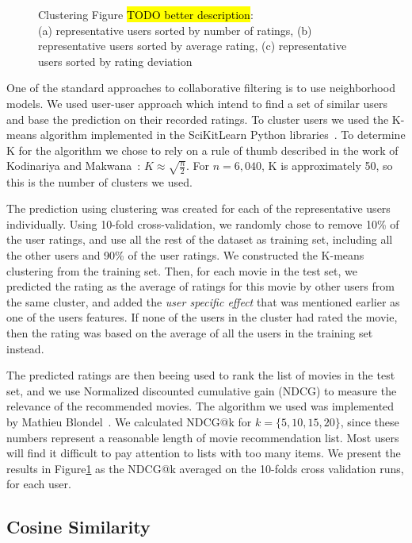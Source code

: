 \begin{figure}
{\begin{tabular}{ c c c}
\end{tabular}
}
\caption{Clustering Figure \hl{TODO better description}: 
\\(a) representative users sorted by number of ratings, (b) representative users sorted by average rating, (c) representative users sorted by rating deviation}
\label{fig:ndcg}  
\end{figure}


One of the standard approaches to collaborative filtering is to use neighborhood models. We used user-user approach which intend to find a set of similar users and base the prediction on their recorded ratings. To cluster users we used the K-means algorithm implemented in the SciKitLearn
Python libraries~\cite{pedregosa2011scikit}. To determine K for the algorithm we chose to rely on a rule of thumb described in the work of Kodinariya and Makwana~\cite{kodinariya2013review}: $K\approx\sqrt{\frac{n}{2}}$. For $n=6,040$, K is approximately 50, so this is the number of clusters we used.

The prediction using clustering was created for each of the representative users individually. Using 10-fold cross-validation, we randomly chose to remove 10\% of the user ratings, and use all the rest of the dataset as training set, including all the other users and 90\% of the user ratings. We constructed the K-means clustering from the training set. Then, for each movie in the test set, we predicted the rating as the average of ratings for this movie by other users from the same cluster, and added the \textit{user specific effect} that was mentioned earlier as one of the users features. If none of the users in the cluster had rated the movie, then the rating was based on the average of all the users in the training set instead.

The predicted ratings are then beeing used to rank the list of movies in the test set, and we use Normalized discounted cumulative gain (NDCG) to measure the relevance of the recommended movies. The algorithm we used was implemented by Mathieu Blondel~\cite{letorMetrics}. We calculated NDCG@k for $k=\{5, 10, 15, 20\}$, since these numbers represent a reasonable length of movie recommendation list. Most users will find it difficult to pay attention to lists with too many items. We present the results in Figure\ref{fig:ndcg} as the NDCG@k averaged on the 10-folds cross validation runs, for each user.


\subsection{Cosine Similarity}

